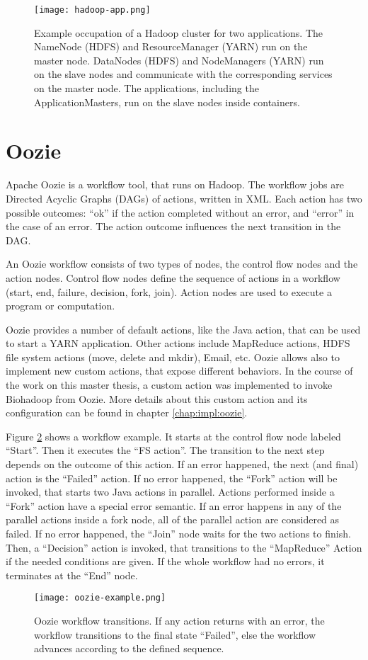 \begin{figure}[ht!]
  \centering
  \texttt{[image: hadoop-app.png]}
  \caption{Example occupation of a Hadoop cluster for two applications. The NameNode (HDFS) and ResourceManager (YARN) run on the master node. DataNodes (HDFS) and NodeManagers (YARN) run on the slave nodes and communicate with the corresponding services on the master node. The applications, including the ApplicationMasters, run on the slave nodes inside containers.}
  \label{fig:hadoop-app}
\end{figure}

\section{Oozie}
\label{chap:hadoop:oozie}
Apache Oozie is a workflow tool, that runs on Hadoop. The workflow jobs are Directed Acyclic Graphs (DAGs) of actions, written in XML. Each action has two possible outcomes: ``ok'' if the action completed without an error, and ``error'' in the case of an error. The action outcome influences the next transition in the DAG. 

An Oozie workflow consists of two types of nodes, the control flow nodes and the action nodes. Control flow nodes define the sequence of actions in a workflow (start, end, failure, decision, fork, join). Action nodes are used to execute a program or computation.

Oozie provides a number of default actions, like the Java action, that can be used to start a YARN application. Other actions include MapReduce actions, HDFS file system actions (move, delete and mkdir), Email, etc. Oozie allows also to implement new custom actions, that expose different behaviors. In the course of the work on this master thesis, a custom action was implemented to invoke Biohadoop from Oozie. More details about this custom action and its configuration can be found in chapter \ref{chap:impl:oozie}.

Figure \ref{fig:oozie-example} shows a workflow example. It starts at the control flow node labeled ``Start''. Then it executes the ``FS action''. The transition to the next step depends on the outcome of this action. If an error happened, the next (and final) action is the ``Failed'' action. If no error happened, the ``Fork'' action will be invoked, that starts two Java actions in parallel. Actions performed inside a ``Fork'' action have a special error semantic. If an error happens in any of the parallel actions inside a fork node, all of the parallel action are considered as failed. If no error happened, the ``Join'' node waits for the two actions to finish. Then, a ``Decision'' action is invoked, that transitions to the ``MapReduce'' Action if the needed conditions are given. If the whole workflow had no errors, it terminates at the ``End'' node.

\begin{figure}[ht!]
  \centering
  \texttt{[image: oozie-example.png]}
  \caption{Oozie workflow transitions. If any action returns with an error, the workflow transitions to the final state ``Failed'', else the workflow advances according to the defined sequence.}
  \label{fig:oozie-example}
\end{figure}
